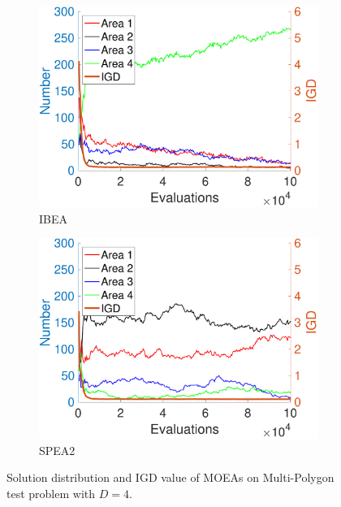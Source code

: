 \documentclass[conference]{IEEEtran}
\begin{document}
\begin{figure}[htbp]
    \begin{subfigure}[b]{.22\textwidth}
    \includegraphics[width=\linewidth]{Section5/dim4/Diversity/IBEA}
    \caption{IBEA}
    \end{subfigure}
    \begin{subfigure}[b]{.22\textwidth}
    \includegraphics[width=\linewidth]{Section5/dim4/Diversity/SPEA2}
    \caption{SPEA2}
    \end{subfigure}
    \caption{Solution distribution and IGD value of MOEAs on Multi-Polygon test problem with $D=4$.}
    \label{fig: MOEAs Diversity dim=4}
\end{figure}
\end{document}
